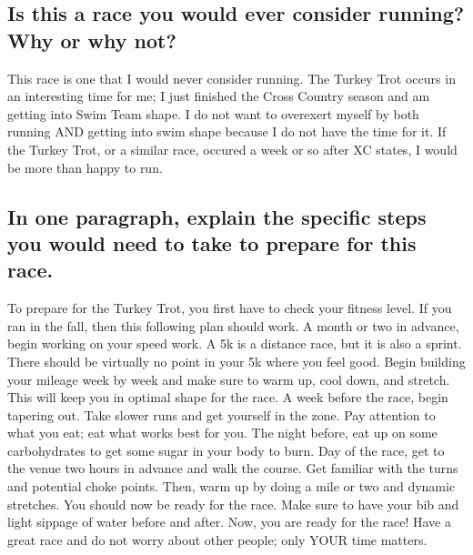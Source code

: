 \documentclass[letterpaper]{article}
\begin{document}
\subsection{Is this a race you would ever consider running? Why or why not?}\label{is-this-a-race-you-would-ever-consider-running-why-or-why-not}

This race is one that I would never consider running. The Turkey Trot occurs in an interesting time for me; I just finished the Cross Country season and am getting into Swim Team shape. I do not want to overexert myself by both running AND getting into swim shape because I do not have the time for it. If the Turkey Trot, or a similar race, occured a week or so after XC states, I would be more than happy to run.

\subsection{In one paragraph, explain the specific steps you would need to take to prepare for this race.}\label{in-one-paragraph-explain-the-specific-steps-you-would-need-to-take-to-prepare-for-this-race.}

To prepare for the Turkey Trot, you first have to check your fitness level. If you ran in the fall, then this following plan should work. A month or two in advance, begin working on your speed work. A 5k is a distance race, but it is also a sprint. There should be virtually no point in your 5k where you feel good. Begin building your mileage week by week and make sure to warm up, cool down, and stretch. This will keep you in optimal shape for the race. A week before the race, begin tapering out. Take slower runs and get yourself in the zone. Pay attention to what you eat; eat what works best for you. The night before, eat up on some carbohydrates to get some sugar in your body to burn. Day of the race, get to the venue two hours in advance and walk the course. Get familiar with the turns and potential choke points. Then, warm up by doing a mile or two and dynamic stretches. You should now be ready for the race. Make sure to have your bib and light sippage of water before and after. Now, you are ready for the race! Have a great race and do not worry about other people; only YOUR time matters.
\end{document}
